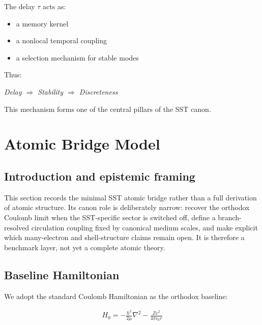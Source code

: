 \documentclass[11pt]{article}
\theoremstyle{definition}
\theoremstyle{plain}
\theoremstyle{remark}
\begin{document}
        The delay $\tau$ acts as:
        
        \begin{itemize}
            \item a memory kernel
            \item a nonlocal temporal coupling
            \item a selection mechanism for stable modes
        \end{itemize}
        
        Thus:
        
        \begin{center}
            \textit{Delay $\Rightarrow$ Stability $\Rightarrow$ Discreteness}
        \end{center}
        
        This mechanism forms one of the central pillars of the SST canon.

        
\section{Atomic Bridge Model}
    \label{sec:atomic}

    \subsection{Introduction and epistemic framing}
        This section records the minimal SST atomic bridge rather than a full derivation of atomic structure. Its canon role is deliberately narrow: recover the orthodox Coulomb limit when the SST-specific sector is switched off, define a branch-resolved circulation coupling fixed by canonical medium scales, and make explicit which many-electron and shell-structure claims remain open. It is therefore a benchmark layer, not yet a complete atomic theory.
    
    \subsection{Baseline Hamiltonian}
        
        We adopt the standard Coulomb Hamiltonian as the orthodox baseline:
        
        \begin{align}
            H_0 = -\frac{\hbar^2}{2\mu} \nabla^2 - \frac{Ze^2}{4\pi \epsilon_0 r}
            \label{eq:coulomb}
        \end{align}
        
\end{document}
